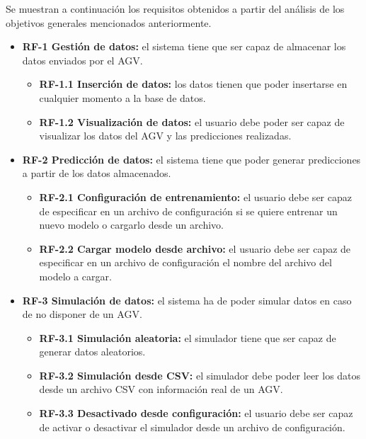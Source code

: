 Se muestran a continuación los requisitos obtenidos a partir del análisis de los objetivos generales mencionados anteriormente.
\begin{itemize}
	\item \textbf{RF-1 Gestión de datos:} el sistema tiene que ser capaz de almacenar los datos enviados por el AGV.
	\begin{itemize}
		\item \textbf{RF-1.1 Inserción de datos:} los datos tienen que poder insertarse en cualquier momento a la base de datos.
		\item \textbf{RF-1.2 Visualización de datos:} el usuario debe poder ser capaz de visualizar los datos del AGV y las
			predicciones realizadas.
	\end{itemize}
	\item \textbf{RF-2 Predicción de datos:} el sistema tiene que poder generar predicciones a partir de los datos almacenados.
	\begin{itemize}
		\item \textbf{RF-2.1 Configuración de entrenamiento: } el usuario debe ser capaz de especificar en un archivo de configuración
			si se quiere entrenar un nuevo modelo o cargarlo desde un archivo.
		\item \textbf{RF-2.2 Cargar modelo desde archivo: } el usuario debe ser capaz de especificar en un archivo de configuración
			el nombre del archivo del modelo a cargar.
	\end{itemize}
	\item \textbf{RF-3 Simulación de datos:} el sistema ha de poder simular datos en caso de no disponer de un AGV.
	\begin{itemize}
		\item \textbf{RF-3.1 Simulación aleatoria:} el simulador tiene que ser capaz de generar datos aleatorios.
		\item \textbf{RF-3.2 Simulación desde CSV:} el simulador debe poder leer los datos desde un archivo CSV con
			información real de un AGV.
		\item \textbf{RF-3.3 Desactivado desde configuración:} el usuario debe ser capaz de activar o desactivar el simulador 
			desde un archivo de configuración.
	\end{itemize}
\end{itemize}


